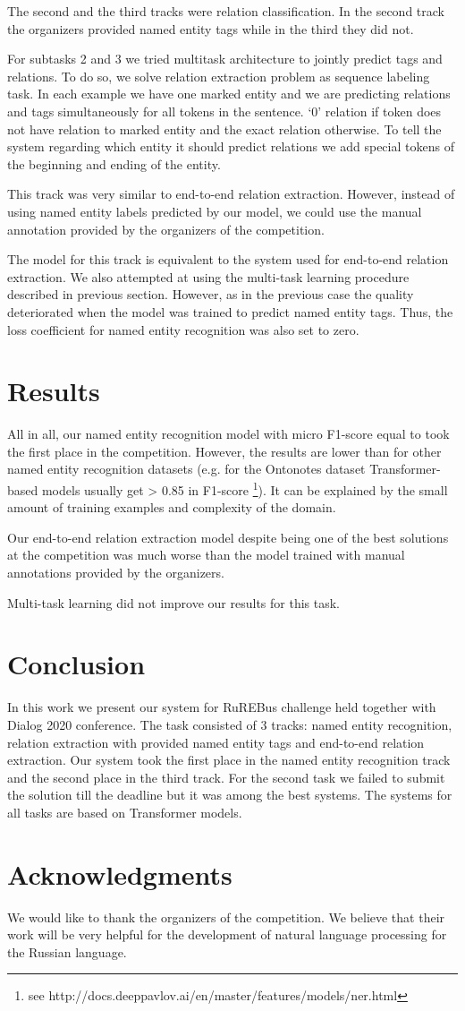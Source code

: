 \documentclass{dialogue}
\begin{document}
The second and the third tracks were relation classification. In the second track the organizers provided named entity tags while in the third they did not.

For subtasks 2 and 3 we tried multitask architecture to jointly predict tags and relations. To do so, we solve relation extraction problem as sequence labeling task. In each example we have one marked entity and we are predicting relations and tags simultaneously for all tokens in the sentence. ‘0’ relation if token does not have relation to marked entity and the exact relation otherwise. To tell the system regarding which entity it should predict relations we add special tokens of the beginning and ending of the entity.


This track was very similar to end-to-end relation extraction. However, instead of using named entity labels predicted by our model, we could use the manual annotation provided by the organizers of the competition.

The model for this track is equivalent to the system used for end-to-end relation extraction. We also attempted at using the multi-task learning procedure described in previous section. However, as in the previous case the quality deteriorated when the model was trained to predict named entity tags. Thus, the loss coefficient for named entity recognition was also set to zero.
\section{Results}
All in all, our named entity recognition model with micro F1-score equal to took the first place in the competition. However, the results are lower than for other named entity recognition datasets (e.g. for the Ontonotes dataset Transformer-based models usually get > 0.85 in F1-score \footnote{see http://docs.deeppavlov.ai/en/master/features/models/ner.html}). It can be explained by the small amount of training examples and complexity of the domain.

Our end-to-end relation extraction model despite being one of the best solutions at the competition was much worse than the model trained with manual annotations provided by the organizers. 

Multi-task learning did not improve our results for this task.
\section{Conclusion}
In this work we present our system for RuREBus challenge held together with Dialog 2020 conference. The task consisted of 3 tracks: named entity recognition, relation extraction with provided named entity tags and end-to-end relation extraction. Our system took the first place in the named entity recognition track and the second place in the third track. For the second task we failed to submit the solution till the deadline but it was among the best systems. The systems for all tasks are based on Transformer models.

\section{Acknowledgments}
We would like to thank the organizers of the competition. We believe that their work will be very helpful for the development of natural language processing for the Russian language.

\end{document}

